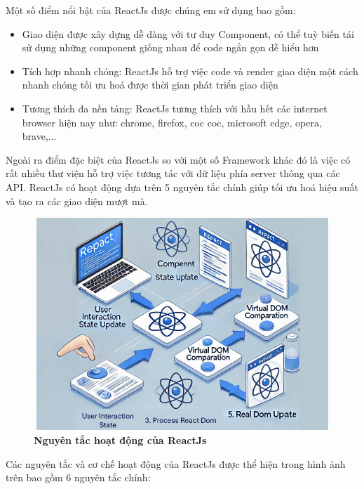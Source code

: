Một số điểm nổi bật của ReactJs được chúng em sử dụng bao gồm:


\begin{itemize}
  \item Giao diện được xây dựng dễ dàng với tư duy Component, có thể tuỳ biến tái sử dụng những component giống nhau để code ngắn gọn dễ hiểu hơn
  \item Tích hợp nhanh chóng: ReactJs hỗ trợ việc code và render giao diện một cách nhanh chóng tối ưu hoá được thời gian phát triển giao diện
  \item Tương thích đa nền tảng: ReactJs tương thích với hầu hết các internet browser hiện nay như: chrome, firefox, coc coc, microsoft edge, opera, brave,...
\end{itemize}

Ngoài ra điểm đặc biệt của ReactJs so với một số Framework khác đó là việc có rất nhiều thư viện hỗ trợ việc tương tác với dữ liệu phía server thông qua các API.
ReactJs có hoạt động dựa trên 5 nguyên tắc chính giúp tối ưu hoá hiệu suất và tạo ra các giao diện mượt mà.

\begin{figure}[H]
  \centering
  \includegraphics[width=12cm,height=8cm]{Images/system/reactjs_action.png}
  \caption[Nguyên tắc hoạt động của ReactJs]{\bfseries \fontsize{12pt}{0pt}
  \selectfont Nguyên tắc hoạt động của ReactJs}
  \label{reactjs_action_code} %
\end{figure}

Các nguyên tắc và cơ chế hoạt động của ReactJs được thể hiện trong hình ảnh trên bao gồm 6 nguyên tắc chính:


